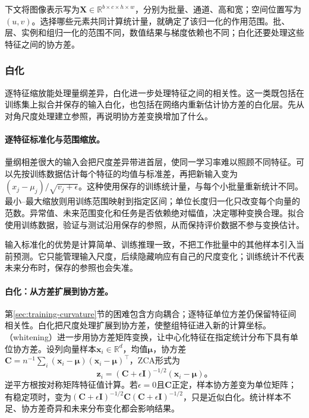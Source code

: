 下文将图像表示写为$\bm X\in\mathbb R^{b\times c\times h\times w}$，分别为批量、通道、高和宽；空间位置写为$(u,v)$。选择哪些元素共同计算统计量，就确定了该归一化的作用范围。批、层、实例和组归一化的范围不同，数值结果与梯度依赖也不同；白化还要处理这些特征之间的协方差。

\subsubsection{白化}
\label{sec:training-whitening}
\label{sec:training-input-scaling}
\label{sec:training-input-response-normalization}
\label{sec:training-other-whitening}
逐特征缩放能处理量纲差异，白化进一步处理特征之间的相关性。这一类既包括在训练集上拟合并保存的输入白化，也包括在网络内重新估计协方差的白化层。先从对角尺度处理建立参照，再说明协方差变换增加了什么。

\paragraph{逐特征标准化与范围缩放。}

量纲相差很大的输入会把尺度差异带进首层，使同一学习率难以照顾不同特征。可以先按训练数据估计每个特征的均值与标准差，再把新输入变为$(x_j-\mu_j)/\sqrt{v_j+\epsilon}$。这种使用保存的训练统计量，与每个小批量重新统计不同。最小--最大缩放则用训练范围映射到指定区间；单位长度归一化只改变每个向量的范数。异常值、未来范围变化和任务是否依赖绝对幅值，决定哪种变换合理。拟合使用训练数据，验证与测试沿用保存的参照，从而保持评价数据不参与变换估计。

输入标准化的优势是计算简单、训练推理一致，不把工作批量中的其他样本引入当前预测。它只能管理输入尺度，后续隐藏响应有自己的尺度变化；训练统计不代表未来分布时，保存的参照也会失准。

\paragraph{白化：从方差扩展到协方差。}

第\ref{sec:training-curvature}节的困难包含方向耦合；逐特征单位方差仍保留特征间相关性。白化把尺度处理扩展到协方差，使整组特征进入新的计算坐标。（whitening）进一步用协方差矩阵变换，让中心化特征在指定统计分布下具有单位协方差。设列向量样本$\bm x_i\in\mathbb R^d$，均值$\bm\mu$，协方差$\bm C=n^{-1}\sum_i(\bm x_i-\bm\mu)(\bm x_i-\bm\mu)^{\top}$，ZCA形式为
\begin{equation}
  \bm z_i=(\bm C+\epsilon\bm I)^{-1/2}(\bm x_i-\bm\mu)\text{。}
  \label{eq:training-whitening}
\end{equation}
逆平方根按对称矩阵特征值计算。若$\epsilon=0$且$\bm C$正定，样本协方差变为单位矩阵；有稳定项时，变为$(\bm C+\epsilon\bm I)^{-1/2}\bm C(\bm C+\epsilon\bm I)^{-1/2}$，只是近似白化。统计样本不足、协方差奇异和未来分布变化都会影响结果。

